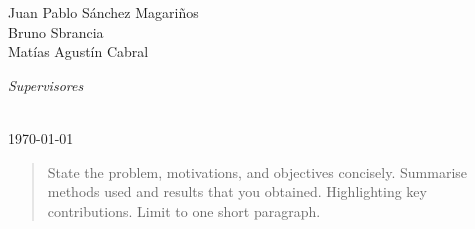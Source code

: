 \begin{titlepage}
\begin{minipage}[t]{.4\textwidth}
\begin{flushleft}
Juan Pablo Sánchez Magariños\\
Bruno Sbrancia\\
Matías Agustín Cabral
\end{flushleft}

\end{minipage}\hfill\begin{minipage}[t]{.4\textwidth}

\begin{flushright}
\emph{Supervisores} 

\end{flushright}
\end{minipage}
\\[1cm]

{\today}\\

\end{titlepage}


\begin{abstract}
State the problem, motivations, and objectives concisely. Summarise methods used and results that you obtained. Highlighting key contributions. Limit to one short paragraph.
\end{abstract}
